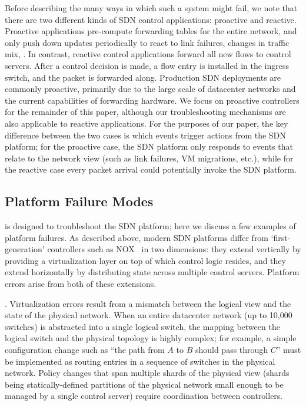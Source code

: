 Before describing the many ways in which such a system might fail, we note that there are two different kinds of SDN control applications: proactive and reactive.
Proactive applications pre-compute forwarding tables for the entire network,
and only push down updates periodically to react to link failures, changes in
traffic mix, \etc. In contrast, reactive control applications forward all new flows to
control servers. After a control decision is made, a flow entry is installed
in the ingress switch, and the packet is forwarded along.
Production SDN deployments are commonly proactive, primarily due to the large
scale of datacenter networks and the current capabilities of forwarding hardware.
We focus on proactive controllers for the remainder of this paper,
although our troubleshooting mechanisms are also applicable to reactive
applications. For the purposes of our paper, the key difference between the two cases is which events trigger actions from the SDN platform; for the proactive case, the SDN platform only responds to events that relate to the network view (such as link failures, VM migrations, etc.), while for the reactive case every packet arrival could potentially invoke the SDN platform.

\subsection{Platform Failure Modes}

\projectname{} is designed to troubleshoot the SDN platform; here we discuss a few examples of platform failures.
As described above, modern SDN platforms differ from
`first-generation' controllers such as NOX~\cite{nox} in two dimensions:
they extend vertically by providing a virtualization layer on top of
which control logic resides, and they extend horizontally by
distributing state across multiple control servers. Platform errors arise from both of
these extensions.

. Virtualization errors result from a mismatch between the logical
view and the state of the physical network. When an entire datacenter
network (up to 10,000 switches) is abstracted into a single logical switch,
the mapping between the logical switch and the
physical topology is highly complex; for example, a simple configuration
change such as ``the path from $A$
 to $B$ should pass through $C$'' must be implemented as routing entries in a sequence
of switches in the physical network. Policy changes
that span multiple shards of the physical view (shards being statically-defined
partitions of the physical network small enough to be managed by a single control
server) require coordination between controllers.

